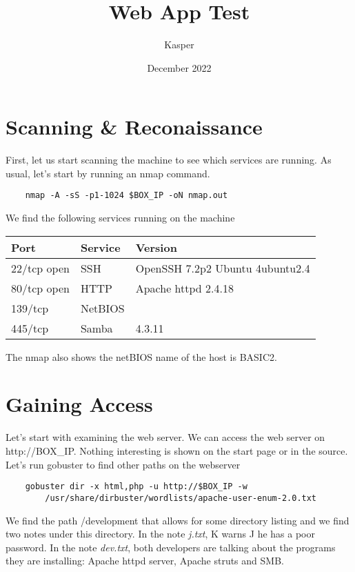 \documentclass{article}
\title{Web App Test}
\author{Kasper}
\date{December 2022}
\begin{document}
\maketitle

\section*{Scanning \& Reconaissance}
First, let us start scanning the machine to see which services are running. As usual, let's start by running an nmap command.

\begin{lstlisting}
    nmap -A -sS -p1-1024 $BOX_IP -oN nmap.out
\end{lstlisting}

We find the following services running on the machine

\begin{table}[h]
\begin{tabular}{|l|l|l|}
\hline
\rowcolor[HTML]{9B9B9B} 
\textbf{Port} & \textbf{Service} & \textbf{Version}                                             \\ \hline
22/tcp open  & SSH            & OpenSSH 7.2p2 Ubuntu 4ubuntu2.4                                       \\ \hline
80/tcp open  & HTTP    & Apache httpd 2.4.18                         \\ \hline
139/tcp & NetBIOS & \\ \hline
445/tcp & Samba & 4.3.11 \\ \hline
\end{tabular}
\end{table}

The nmap also shows the netBIOS name of the host is BASIC2.

\section*{Gaining Access}
Let's start with examining the web server. We can access the web server on http://BOX\_IP. Nothing interesting is shown on the start page or in the source. Let's run gobuster to find other paths on the webserver 

\begin{lstlisting}
    gobuster dir -x html,php -u http://$BOX_IP -w 
        /usr/share/dirbuster/wordlists/apache-user-enum-2.0.txt
\end{lstlisting}

We find the path /development that allows for some directory listing and we find two notes under this directory. In the note \textit{j.txt}, K warns J he has a poor password. In the note \textit{dev.txt}, both developers are talking about the programs they are installing: Apache httpd server, Apache struts and SMB. 
\end{document}
